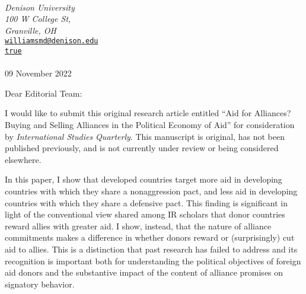\documentclass[
  11pt,
]{article}
\author{}
\date{09 November 2022}
\date{}
\begin{document}
\hfill
\begin{minipage}[t]{1\textwidth}
\raggedleft%
{\bfseries  }\\[.35ex]
\emph{\small Denison University\\
100 W College St,\\
Granville, OH} \\[.35ex]

 \small{\tt \href{mailto:williamsmd@denison.edu}{\nolinkurl{williamsmd@denison.edu}}} \\ 
 \small{\href{http://true}{\tt true}}\\ 
\hspace{1cm} \\
 09 November 2022 \\ 
\end{minipage}


\vspace*{1em}

Dear Editorial Team:

\vspace*{1em}

 

% 
% 

% 
I would like to submit this original research article entitled ``Aid for
Alliances? Buying and Selling Alliances in the Political Economy of
Aid'' for consideration by \emph{International Studies Quarterly}. This
manuscript is original, has not been published previously, and is not
currently under review or being considered elsewhere.

In this paper, I show that developed countries target more aid in
developing countries with which they share a nonaggression pact, and
less aid in developing countries with which they share a defensive pact.
This finding is significant in light of the conventional view shared
among IR scholars that donor countries reward allies with greater aid. I
show, instead, that the nature of alliance commitments makes a
difference in whether donors reward or (surprisingly) cut aid to allies.
This is a distinction that past research has failed to address and its
recognition is important both for understanding the political objectives
of foreign aid donors and the substantive impact of the content of
alliance promises on signatory behavior.
\end{document}
